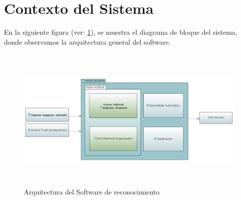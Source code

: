 
\section{Contexto del Sistema}\label{sub:casodeuso}

En la siguiente figura (ver: \ref{Fig: diagbloque}), se muestra el diagrama de bloque del sistema, donde observamos la arquitectura general del software. 

\begin{figure}[H]
 \centering
  \includegraphics[height=7cm,keepaspectratio=true,clip=true]{imagenes/Logos/diagramabloque.png}
  \caption{Arquitectura del Software de reconocimiento}
	\label{Fig: diagbloque}
 \end{figure}
